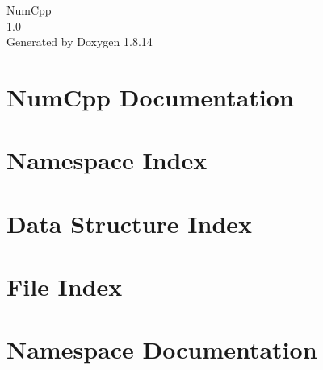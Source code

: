 \documentclass[twoside]{book}
\newcommand{\+}{\discretionary{\mbox{\scriptsize$\hookleftarrow$}}{}{}}
\newcommand{\clearemptydoublepage}{%
  \newpage{\pagestyle{empty}\cleardoublepage}%
}
\begin{document}
\hypersetup{pageanchor=false,
             bookmarksnumbered=true,
             pdfencoding=unicode
            }
\begin{titlepage}
\vspace*{7cm}
\begin{center}%
{\Large Num\+Cpp \\[1ex]\large 1.\+0 }\\
\vspace*{1cm}
{\large Generated by Doxygen 1.8.14}\\
\end{center}
\end{titlepage}
\clearemptydoublepage
{}
\tableofcontents
\clearemptydoublepage
{}
\hypersetup{pageanchor=true}

\chapter{Num\+Cpp Documentation}
\label{index}\hypertarget{index}{}
\chapter{Namespace Index}

\chapter{Data Structure Index}

\chapter{File Index}

\chapter{Namespace Documentation}





\end{document}
